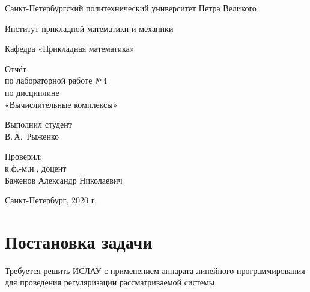 \documentclass[12pt,a4paper]{scrartcl}
\begin{document}
\begin{titlepage}
  \begin{center}

    Санкт-Петербургский политехнический университет Петра Великого

    \vspace{0.25cm}
    
    Институт прикладной математики и механики
    
    Кафедра «Прикладная математика»
    \vfill

	\vspace{0.25cm}
	    Отчёт\\
	по лабораторной работе №4\\
	по дисциплине\\
	«Вычислительные комплексы»

  \bigskip

\end{center}
\vfill

\newlength{\ML}
\hfill\begin{minipage}{0.4\textwidth}
  Выполнил студент\\ В.\,А.~Рыженко\\
\end{minipage}%
\bigskip

\hfill\begin{minipage}{0.4\textwidth}
  Проверил:\\
к.ф.-м.н., доцент\\
Баженов Александр Николаевич\\
\end{minipage}%
\vfill

\begin{center}
  Санкт-Петербург, 2020 г.
\end{center}
\end{titlepage}

\tableofcontents
\newpage


\section{Постановка задачи}

Требуется решить ИСЛАУ с применением аппарата линейного программирования для проведения регуляризации рассматриваемой системы. 
\end{document}
